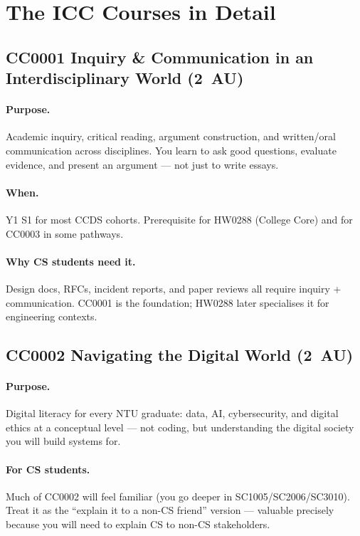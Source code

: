 \section{The ICC Courses in Detail}
\label{sec:icc-courses}

\subsection{CC0001 Inquiry \& Communication in an Interdisciplinary World (2~AU)}
\paragraph{Purpose.} Academic inquiry, critical reading, argument construction, and written/oral communication across disciplines. You learn to ask good questions, evaluate evidence, and present an argument --- not just to write essays.

\paragraph{When.} Y1 S1 for most CCDS cohorts. Prerequisite for HW0288 (College Core) and for CC0003 in some pathways.

\paragraph{Why CS students need it.} Design docs, RFCs, incident reports, and paper reviews all require inquiry + communication. CC0001 is the foundation; HW0288 later specialises it for engineering contexts.

\subsection{CC0002 Navigating the Digital World (2~AU)}
\paragraph{Purpose.} Digital literacy for every NTU graduate: data, AI, cybersecurity, and digital ethics at a conceptual level --- not coding, but understanding the digital society you will build systems for.

\paragraph{For CS students.} Much of CC0002 will feel familiar (you go deeper in SC1005/SC2006/SC3010). Treat it as the ``explain it to a non-CS friend'' version --- valuable precisely because you will need to explain CS to non-CS stakeholders.

